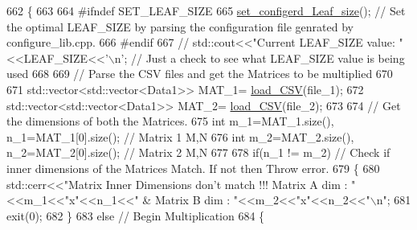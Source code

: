 \begin{DoxyCode}
662                                 \{   
663                                         
664 \textcolor{preprocessor}{                                        #ifndef SET\_LEAF\_SIZE }
665                                                 \hyperlink{classMATOPS_1_1BigMatrix_a89f5328b2686ef2a0dfaa9c2bd852d37}{set\_configerd\_Leaf\_size}(); \textcolor{comment}{// Set
       the optimal LEAF\_SIZE by parsing the configuration file genrated by configure\_lib.cpp.}
666 \textcolor{preprocessor}{                                        #endif}
667                                         \textcolor{comment}{// std::cout<<"Current LEAF\_SIZE value: "<<LEAF\_SIZE<<'\(\backslash\)n'; // Just
       a check to see what LEAF\_SIZE value is being used}
668                                         
669                                         \textcolor{comment}{// Parse the CSV files and get the Matrices to be multiplied}
670 
671                                         std::vector<std::vector<Data1>> MAT\_1= 
      \hyperlink{classMATOPS_1_1BigMatrix_a43e1704cb38eb6d0121be5b71014eb8e}{load\_CSV}(file\_1);
672                                         std::vector<std::vector<Data1>> MAT\_2= 
      \hyperlink{classMATOPS_1_1BigMatrix_a43e1704cb38eb6d0121be5b71014eb8e}{load\_CSV}(file\_2);
673 
674                                         \textcolor{comment}{// Get the dimensions of both the Matrices.}
675                                         \textcolor{keywordtype}{int} m\_1=MAT\_1.size(), n\_1=MAT\_1[0].size();  \textcolor{comment}{// Matrix 1 M,N}
676                                         \textcolor{keywordtype}{int} m\_2=MAT\_2.size(), n\_2=MAT\_2[0].size(); \textcolor{comment}{// Matrix 2 M,N}
677 
678                                         \textcolor{keywordflow}{if}(n\_1 != m\_2) \textcolor{comment}{// Check if inner dimensions of the Matrices Match.
       If not then Throw error.}
679                                         \{
680                                                 std::cerr<<\textcolor{stringliteral}{"Matrix Inner Dimensions don't match !!! Matrix
       A dim : "}<<m\_1<<\textcolor{stringliteral}{"x"}<<n\_1<<\textcolor{stringliteral}{" & Matrix B dim : "}<<m\_2<<\textcolor{stringliteral}{"x"}<<n\_2<<\textcolor{stringliteral}{"\(\backslash\)n"};
681                                                 exit(0);
682                                         \}
683                                         \textcolor{keywordflow}{else}  \textcolor{comment}{// Begin Multiplication}
684                                         \{

\end{DoxyCode}

